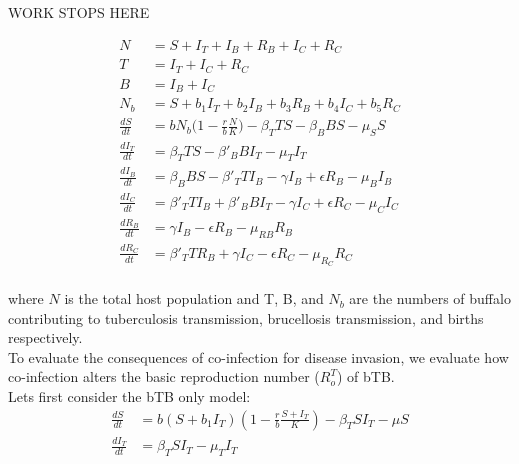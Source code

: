 \documentclass[letterpaper,12pt]{article}
\begin{document}
\pagebreak








WORK STOPS HERE




\pagebreak 

\begin{align*}
N & = S + I_{T} + I_{B} + R_{B} + I_{C} + R_{C} \\
T &= I_{T} + I_{C} + R_{C} \\
B &= I_B+I_C \\
N_{b} &= S + b_1 I_{T}+ b_2 I_{B} + b_3 R_{B} + b_4 I_{C} + b_5 R_{C} \\
\frac{dS}{dt} &= b N_b \big(1 - \frac{r}{b} \frac{N}{K}\big) - \beta_T T S - \beta_B B S - \mu_{S} S  \\		      			%
\frac{dI_{T}}{dt}&= \beta_T T S -  \beta'_{B} B I_{T} - \mu_{T} I_{T} \\									%
\frac{dI_{B}}{dt}&=  \beta_B B S - \beta'_T T I_{B} - \gamma I_{B} + \epsilon R_{B}  - \mu_{B} I_{B} \\ 		 	%
\frac{dI_{C}}{dt}&=  \beta'_T T I_{B} + \beta'_{B} B I_{T} - \gamma I_{C} + \epsilon R_{C}  - \mu_{C} I_{C}  \\  		%
\frac{dR_{B}}{dt}&=  \gamma I_{B} - \epsilon R_{B} - \mu_{RB} R_{B} \\  												%
\frac{dR_{C}}{dt}&=  \beta'_T T R_{B} + \gamma I_{C} - \epsilon R_{C} - \mu_{R_{C}} R_{C} \\ 						%
\end{align*}

where $N$ is the total host population and T, B, and $N_b$ are the numbers of buffalo contributing to tuberculosis transmission, brucellosis transmission, and births respectively. \\

To evaluate the consequences of co-infection for disease invasion, we evaluate how co-infection alters the basic reproduction number ($R_{o}^{T}$) of bTB. \\
Lets first consider the bTB only model: 
\begin{align*}
\frac{dS}{dt}&=b (S + b_1 I_T)\left(1-\frac{r}{b}\frac{S+I_T}{K}\right) -\beta_T S I_T - \mu S\\
\frac{dI_T}{dt}&=\beta_T S I_T - \mu_{T} I_T
\end{align*}
\end{document}
